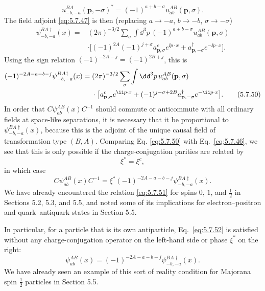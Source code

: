 \begin{equation}
u^{BA}_{-b,-a}(\mathbf p,-\sigma)^*=(-1)^{a+b-\sigma}
u^{AB}_{ab}(\mathbf p,\sigma).
\tag{5.7.49}\label{eq:5.7.49}
\end{equation}
The field adjoint \eqref{eq:5.7.47} is then (replacing
$a\to-a$, $b\to-b$, $\sigma\to-\sigma$)
\begin{align*}
\psi^{BA\dagger}_{-b,-a}(x)={}&(2\pi)^{-3/2}\sum_\sigma\int \dd^3p\,
(-1)^{a+b-\sigma}u^{AB}_{ab}(\mathbf p,\sigma)
\\
&\cdot\bigl[(-1)^{2A}(-1)^{j+\sigma}a^c_{\mathbf p,\sigma}e^{\ii p\cdot x}
+a^\dagger_{\mathbf p,-\sigma}e^{-\ii p\cdot x}\bigr].
\end{align*}
Using the sign relation $(-1)^{-2A-j}=(-1)^{2B+j}$, this is
\begin{align}
(-1)^{-2A-a-b-j}\psi^{BA\dagger}_{-b,-a}(x)
={}&(2\pi)^{-3/2}\sum_\sigma\int \dd^3p\,u^{AB}_{ab}(\mathbf p,\sigma)
\notag\\
&\cdot\bigl[a^c_{\mathbf p,\sigma}e^{\ii p\cdot x}
+(-1)^{j-\sigma+2B}a^\dagger_{\mathbf p,-\sigma}e^{-\ii p\cdot x}\bigr].
\tag{5.7.50}\label{eq:5.7.50}
\end{align}
In order that $C\psi^{AB}_{ab}(x)C^{-1}$ should commute or anticommute with
all ordinary fields at space-like separations, it is necessary that it be
proportional to $\psi^{BA\dagger}_{-b,-a}(x)$, because this is the adjoint of
the unique causal field of transformation type $(B,A)$. Comparing Eq.
\eqref{eq:5.7.50} with Eq.~\eqref{eq:5.7.46}, we see that this is only possible if the
charge-conjugation parities are related by
\begin{equation}
\xi^*=\xi^c,
\tag{5.7.51}\label{eq:5.7.51}
\end{equation}
in which case
\begin{equation}
C\psi^{AB}_{ab}(x)C^{-1}=
\xi^*(-1)^{-2A-a-b-j}\psi^{BA\dagger}_{-b,-a}(x).
\tag{5.7.52}\label{eq:5.7.52}
\end{equation}
We have already encountered the relation \eqref{eq:5.7.51} for spins $0$, $1$, and
$\tfrac12$ in Sections 5.2, 5.3, and 5.5, and noted some of its implications
for electron--positron and quark--antiquark states in Section 5.5.

In particular, for a particle that is its own antiparticle, Eq.~\eqref{eq:5.7.52} is
satisfied without any charge-conjugation operator on the left-hand side or
phase $\xi^*$ on the right:
\begin{equation}
\psi^{AB}_{ab}(x)=(-1)^{-2A-a-b-j}\psi^{BA\dagger}_{-b,-a}(x).
\tag{5.7.53}\label{eq:5.7.53}
\end{equation}
We have already seen an example of this sort of reality condition for Majorana
spin $\tfrac12$ particles in Section 5.5.

